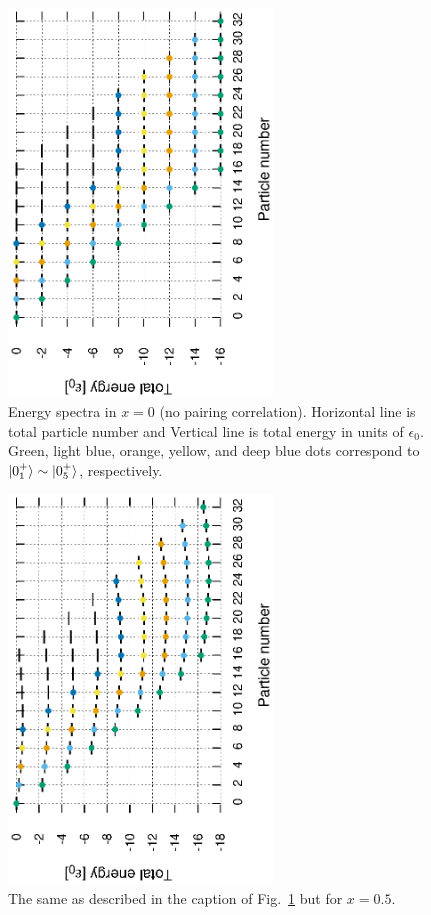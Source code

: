\documentclass[11pt]{book} %
\begin{document}
\begin{figure}[htbp]
 \begin{center}
  \includegraphics[width=70mm,angle=-90]{images/spectra_x0.eps}
 \end{center}
 \caption{Energy spectra in $x=0$ (no pairing correlation). Horizontal line is total particle number and Vertical line is total energy in units of $\epsilon_0$. Green, light blue, orange, yellow, and deep blue dots correspond to $\ket{0_1^+}\sim\ket{0_5^+}$, respectively.
	}
 \label{x0}
\end{figure}

\begin{figure}[htbp]
 \begin{center}
  \includegraphics[width=70mm,angle=-90]{images/spectra_x0p5.eps}
 \end{center}
 \caption{The same as described in the caption of Fig.~\ref{x0} but for $x=0.5$.
	}
 \label{x0p5}
\end{figure}
\end{document}

